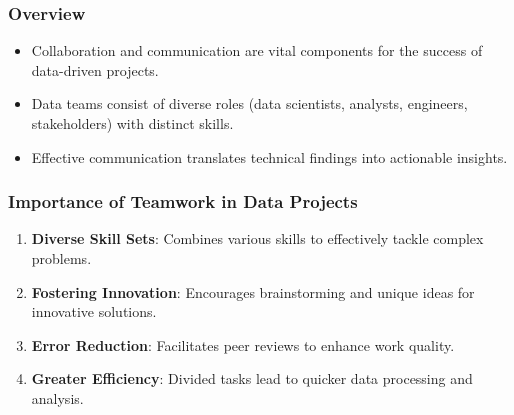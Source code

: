 \documentclass[aspectratio=169]{beamer}
\begin{document}
\begin{frame}[fragile]
    \frametitle{Overview}
    \begin{itemize}
        \item Collaboration and communication are vital components for the success of data-driven projects.
        \item Data teams consist of diverse roles (data scientists, analysts, engineers, stakeholders) with distinct skills.
        \item Effective communication translates technical findings into actionable insights.
    \end{itemize}
\end{frame}

\begin{frame}[fragile]
    \frametitle{Importance of Teamwork in Data Projects}
    \begin{enumerate}
        \item \textbf{Diverse Skill Sets}: Combines various skills to effectively tackle complex problems.
        \item \textbf{Fostering Innovation}: Encourages brainstorming and unique ideas for innovative solutions.
        \item \textbf{Error Reduction}: Facilitates peer reviews to enhance work quality.
        \item \textbf{Greater Efficiency}: Divided tasks lead to quicker data processing and analysis.
    \end{enumerate}
\end{frame}
\end{document}
